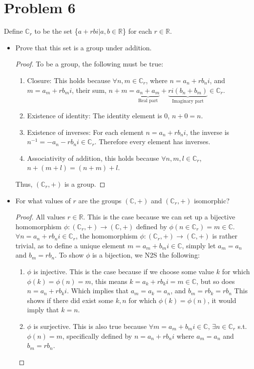 \documentclass[hidelinks,12pt]{article}
\newcommand{\C}{\mathbb{C}}
\newcommand{\R}{\mathbb{R}}
\begin{document}
\section{Problem 6} 
Define $\C_r$ to be the set \{$a+rbi|a,b\in\R$\} for each $r\in\R$.\begin{itemize}
    \item Prove that this set is a group under addition.\begin{proof}To be a group, the following must be true:\begin{enumerate}[label=(\alph*)]
        \item Closure: This holds because $\forall n,m\in\C_r$, where $n=a_n+rb_ni$, and $m=a_m+rb_mi$, their sum, $n+m=\underbrace{a_n+a_m}_{\text{Real part}}+\underbrace{ri(b_n+b_m)}_{\text{Imaginary part}}\in\C_r$.
        \item Existence of identity: The identity element is $0$, $n+0=n$.
        \item Existence of inverses: For each element $n=a_n+rb_ni$, the inverse is $n^{-1}=-a_n-rb_ni\in\C_r$. Therefore every element has inverses.
        \item Associativity of addition, this holds because $\forall n,m,l\in\C_r$, $n+(m+l)=(n+m)+l$.
    \end{enumerate}Thus, $(\C_r,+)$ is a group.
    \end{proof}
    \item For what values of $r$ are the groups $(\C,+)$ and $(\C_r,+)$ isomorphic?\begin{proof}All values $r\in\R$. This is the case because we can set up a bijective homomorphism $\phi:(\C_r,+)\to (\C,+)$ defined by $\phi(n\in\C_r)=m\in\C$. $\forall n=a_n+rb_ni\in\C_r$, the homomorphism $\phi:(\C_r,+)\to (\C,+)$ is rather trivial, as to define a unique element $m=a_m+b_mi\in\C$, simply let $a_m=a_n$ and $b_m=rb_n$. To show $\phi$ is a bijection, we N2S the following:\begin{enumerate}[label=(\alph*)]
        \item $\phi$ is injective. This is the case because if we choose some value $k$ for which $\phi(k)=\phi(n)=m$, this means $k=a_k+rb_ki=m\in\C$, but so does $n=a_n+rb_ki$. Which implies that $a_m=a_k=a_n$, and $b_m=rb_k=rb_n$ This shows if there did exist some $k,n$ for which $\phi(k)=\phi(n)$, it would imply that $k=n$.
        \item $\phi$ is surjective. This is also true because $\forall m=a_m+b_mi\in\C$, $\exists n\in\C_r$ s.t. $\phi(n)=m$, specifically defined by $n=a_n+rb_ni$ where $a_m=a_n$ and $b_m=rb_n$.
    \end{enumerate}
    \end{proof}
\end{itemize}
\end{document}
